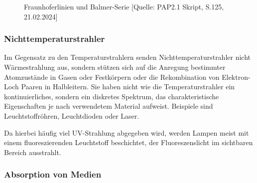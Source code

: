 \documentclass{article}
\begin{document}
\begin{figure}[!h]
  \centering
  \hfill
  \caption{Fraunhoferlinien und Balmer-Serie [Quelle: PAP2.1 Skript, S.125, 21.02.2024]}
  \label{fig:fraunh_balmer}
\end{figure}


\subsubsection{Nichttemperaturstrahler}

Im Gegensatz zu den Temperaturstrahlern senden Nichttemperaturstrahler nicht Wärmestrahlung aus, sondern stützen sich auf die Anregung bestimmter Atomzustände in Gasen oder Festkörpern oder die Rekombination von Elektron-Loch Paaren in Halbleitern. Sie haben nicht wie die Temperaturstrahler ein kontinuierliches, sondern ein diskretes Spektrum, das charakteristische Eigenschaften je nach verwendetem Material aufweist. Beispiele sind Leuchtstoffröhren, Leuchtdioden oder Laser. 

Da hierbei häufig viel UV-Strahlung abgegeben wird, werden Lampen meist mit einem fluoreszierenden Leuchtstoff beschichtet, der Fluoreszenslicht im sichtbaren Bereich ausstrahlt. 

\subsubsection{Absorption von Medien}
\end{document}
